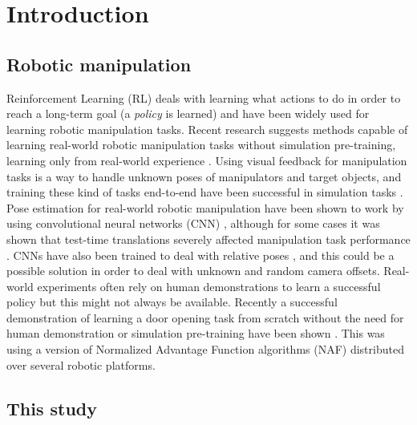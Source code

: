 \chapter{Introduction}

\section{Robotic manipulation}

Reinforcement Learning (RL) deals with learning what actions to do in order to
reach a long-term goal (a \textit{policy} is learned) and have been widely used
for learning robotic manipulation tasks. Recent research suggests methods
capable of learning real-world robotic manipulation tasks without simulation
pre-training, learning only from real-world experience
\cite{yahya2016collective,gu2016deep,finn2016deep,chebotar2016path}. Using
visual feedback for manipulation tasks is a way to handle unknown poses of
manipulators and target objects, and training these kind of tasks end-to-end
have been successful in simulation tasks
\cite{schulman2015trust,lillicrap2015continuous}. Pose estimation for
real-world robotic manipulation have been shown to work by using convolutional
neural networks (CNN)
\cite{levine2016end,chebotar2016path,yahya2016collective}, although for some
cases it was shown that test-time translations severely affected manipulation
task performance \cite{yahya2016collective}. CNNs have also been trained to
deal with relative poses \cite{park20163d}, and this could be a possible
solution in order to deal with unknown and random camera offsets. Real-world
experiments often rely on human demonstrations to learn a successful policy but
this might not always be available. Recently a successful demonstration of
learning a door opening task from scratch without the need for human
demonstration or simulation pre-training have been shown \cite{gu2016deep}.
This was using a version of Normalized Advantage Function algorithms (NAF)
\cite{gu2016continuous} distributed over several robotic platforms.

\section{This study}

